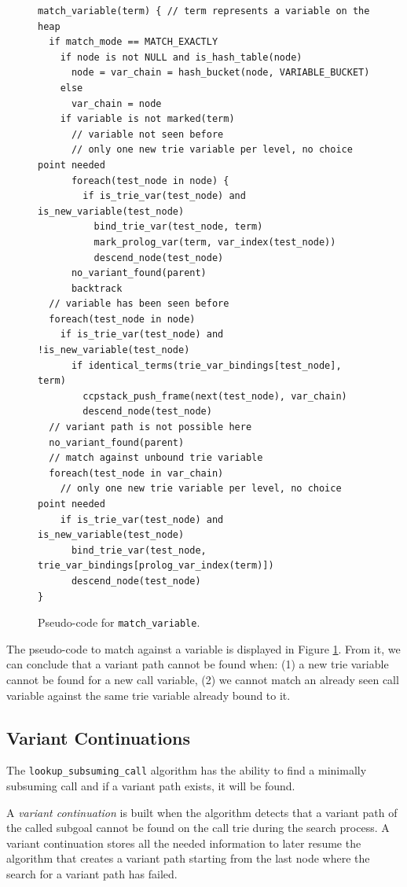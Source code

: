 \begin{figure}[ht]
\begin{Verbatim}
match_variable(term) { // term represents a variable on the heap
  if match_mode == MATCH_EXACTLY
    if node is not NULL and is_hash_table(node)
      node = var_chain = hash_bucket(node, VARIABLE_BUCKET)
    else
      var_chain = node
    if variable is not marked(term)
      // variable not seen before
      // only one new trie variable per level, no choice point needed
      foreach(test_node in node) {
        if is_trie_var(test_node) and is_new_variable(test_node)
          bind_trie_var(test_node, term)
          mark_prolog_var(term, var_index(test_node))
          descend_node(test_node)
      no_variant_found(parent)
      backtrack
  // variable has been seen before
  foreach(test_node in node)
    if is_trie_var(test_node) and !is_new_variable(test_node)
      if identical_terms(trie_var_bindings[test_node], term)
        ccpstack_push_frame(next(test_node), var_chain)
        descend_node(test_node)
  // variant path is not possible here
  no_variant_found(parent)
  // match against unbound trie variable
  foreach(test_node in var_chain)
    // only one new trie variable per level, no choice point needed
    if is_trie_var(test_node) and is_new_variable(test_node)
      bind_trie_var(test_node, trie_var_bindings[prolog_var_index(term)])
      descend_node(test_node)
}
\end{Verbatim}
\caption{Pseudo-code for \texttt{match\_variable}.}
\label{fig:match_variable}
\end{figure}

The pseudo-code to match against a variable is displayed in Figure
\ref{fig:match_variable}. From it, we can conclude that a variant path
cannot be found when: (1) a new trie variable cannot be found
for a new call variable, (2) we cannot match an already seen
call variable against the same trie variable already bound to it.

\subsection{Variant Continuations}

The \texttt{lookup\_subsuming\_call} algorithm has the ability to find a
minimally subsuming call and if a variant path exists, it will be found.

A \textit{variant continuation} is built when the algorithm detects that a variant path of the
called subgoal cannot be found on the call trie during the search process.
A variant continuation stores all the needed information to later resume
the algorithm that creates a variant path starting from the last node where the
search for a variant path has failed.

